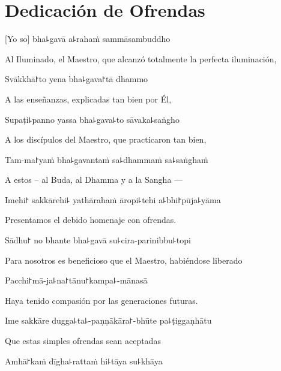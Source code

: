 \chapter{Dedicación de Ofrendas}

[Yo so] bha꜕gavā a꜕rahaṁ sammāsambuddho

\begin{english}
Al Iluminado, el Maestro, que alcanzó totalmente la perfecta iluminación,
\end{english}

Svākkhā꜓to yena bha꜕gava꜓tā dhammo

\begin{english}
A las enseñanzas, explicadas tan bien por Él,
\end{english}

Supaṭi꜕panno yassa bha꜕gava꜕to sāvaka꜕saṅgho

\begin{english}
A los discípulos del Maestro, que practicaron tan bien,
\end{english}

Tam-ma꜓yaṁ bha꜕gavantaṁ sa꜕dhammaṁ sa꜕saṅghaṁ

\begin{english}
A estos – al Buda, al Dhamma y a la Sangha ---
\end{english}

Imehi꜓ sakkārehi꜕ yathārahaṁ āropi꜕tehi a꜕bhi꜓pūja꜕yāma

\begin{english}
Presentamos el debido homenaje con ofrendas.
\end{english}

Sādhu꜓ no bhante bha꜕gavā su꜕cira-parinibbu꜕topi

\begin{english}
Para nosotros es beneficioso que el Maestro, habiéndose liberado
\end{english}

Pacchi꜓mā-ja꜕na꜓tānu꜓kampa꜕-mānasā

\begin{english}
Haya tenido compasión por las generaciones futuras.
\end{english}

Ime sakkāre dugga꜕ta꜕-paṇṇākāra꜓-bhūte pa꜕ṭiggaṇhātu

\begin{english}
Que estas simples ofrendas sean aceptadas
\end{english}

Amhā꜓kaṁ dīgha꜕rattaṁ hi꜕tāya su꜕khāya

